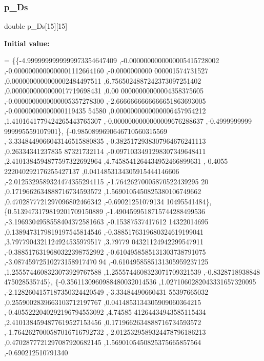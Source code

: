 \mbox{\label{a00455_a0d83f56b559ca5d47e6c6667c03a1ef3}} 
\subsubsection{\texorpdfstring{p\+\_\+\+Ds}{p\_Ds}}
{\footnotesize\ttfamily double p\+\_\+\+Ds\mbox{[}15\mbox{]}\mbox{[}15\mbox{]}}

{\bfseries Initial value\+:}
\begin{DoxyCode}
= \{\{-4.9999999999999973354647409 ,-0.0000000000000005415728002 ,-0.0000000000000001112664160 ,-0.0000000000
      000001574731527 ,0.0000000000000002484497511 ,6.7565024887242373097251402 ,0.0000000000000017719698431 ,0.00
      00000000000004358375605 ,-0.0000000000000005357278300 ,-2.6666666666666651863693005 ,-0.00000000000000119435
      54580 ,0.0000000000000006457954212 ,1.4101641779424265443765307 ,-0.0000000000000009676288637 ,-0.4999999999
      999995559107901\},
\{-0.9850899690646710560315569 ,-3.3348449066043146515880835 ,-0.3825172938307964676241113 ,0.26334341237835
      87321732114 ,-0.0971033491298307349648411 ,2.4101384594877597322692964 ,4.7458541264434952466899631 ,-0.4055
      222040292176255427137 ,0.0414853134305915444146606 ,-2.0125329589324474355294115 ,-1.76426270005870522439295
      20 ,0.1719662634888716734593572 ,1.5690105450825380106749662 ,0.4702877721297096802466342 ,-0.69021251079134
      10495541484\},
\{0.5139473179819201709150889 ,-1.4904599518715744288499536 ,-3.1969304958558404372581663 ,-0.15387537417612
      14322014695 ,0.1389473179819197545814546 ,-0.3885176319680324619199041 ,3.7977904321124924535979517 ,3.79779
      04321124942299547911 ,-0.3885176319680322398752992 ,-0.6104958585131303738791075 ,-3.08745972510273158917470
      94 ,-0.6104958585131305959237125 ,1.2555744608323073929767588 ,1.2555744608323071709321539 ,-0.8328718938848
      475028535745\},
\{-0.3561130960988480032014536 ,1.0271060282043331657320095 ,-2.1282604157187350324420549 ,-3.33484490660431
      55397665032 ,0.2559002839663103712197767 ,0.0414853134305909060364215 ,-0.4055222040292196794553092 ,4.74585
      41264434943585115434 ,2.4101384594877619527153456 ,0.1719662634888716734593572 ,-1.7642627000587016716792732
       ,-2.0125329589324478796186213 ,0.4702877721297087920682145 ,1.5690105450825375665857564 ,-0.690212510791340

\end{DoxyCode}
